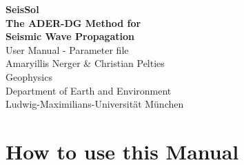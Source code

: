 \documentclass[12pt,twoside]{article}
\begin{document}
\begin{titlepage}

\thispagestyle{empty}
\begin{center}
{\bf{\Huge SeisSol }}\\
\vspace{0,5cm}
{\bf{\Large The ADER-DG Method for \\
\vspace{0,2cm}
           Seismic Wave Propagation}} \\
\vspace{4,0cm}
{\LARGE{\sc User Manual - Parameter file}}\\
\vspace{4,0cm}
{\Large Amaryillis Nerger \& Christian Pelties\\}
\vspace{2,5cm}
{\Large{\sc Geophysics\\
Department of Earth and Environment\\
Ludwig-Maximilians-Universit\"at M\"unchen\\}}
\end{center}
 
\end{titlepage}
\addtolength{\topmargin}{-0.5cm}
\pagestyle{headings}

\newpage
\thispagestyle{empty}
\rule{0cm}{1cm}


\tableofcontents

\newpage

\section{How to use this Manual}
\end{document}
